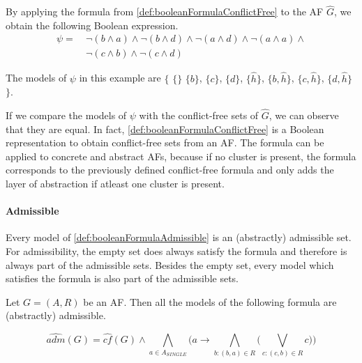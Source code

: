 \begin{example}
By applying the formula from \cref{def:booleanFormulaConflictFree} to the AF $\hat{G}$, we obtain the following Boolean expression.
\begin{align*}
    \psi =\ &
    \lnot(b \land a)  \land
    \lnot(b \land d)  \land
    \lnot(a \land d)  \land
    \lnot(a \land a)  \land
    \\
    & \lnot(c \land b)  \land
    \lnot(c \land d)
\end{align*}

The models of $\psi$ in this example are $\bigl\{$ $\{\}$ $\{b\}$, $\{c\}$, $\{d\}$, $\{\hat{h}\}$, $\{b, \hat{h}\}$, $\{c, \hat{h}\}$, $\{d, \hat{h}\}$ $\bigl\}$.
\end{example}

If we compare the models of $\psi$ with the conflict-free sets of $\hat{G}$, we can observe that they are equal. In fact, \cref{def:booleanFormulaConflictFree} is a Boolean representation to obtain conflict-free sets from an AF. The formula can be applied to concrete and abstract AFs, because if no cluster is present, the formula corresponds to the previously defined conflict-free formula and only adds the layer of abstraction if atleast one cluster is present.


\paragraph{Admissible} Every model of \cref{def:booleanFormulaAdmissible} is an (abstractly) admissible set. For admissibility, the empty set does always satisfy the formula and therefore is always part of the admissible sets. Besides the empty set, every model which satisfies the formula is also part of the admissible sets.

\begin{definition}
    Let $G=(A,R)$ be an AF. Then all the models of the following formula are (abstractly) admissible.
    \begin{center}
        \[ \hat{adm}(G)=
        \hat{cf}(G) \land  \bigwedge_{a \in A_{\!S\!I\!N\!G\!L\!E}} \big( a \rightarrow \bigwedge_{b:(b,a) \in R} \big( \bigvee_{c:(c,b) \in R} c\big) \big)
        \]
    \end{center}
    \label{def:booleanFormulaAdmissible}
\end{definition}


